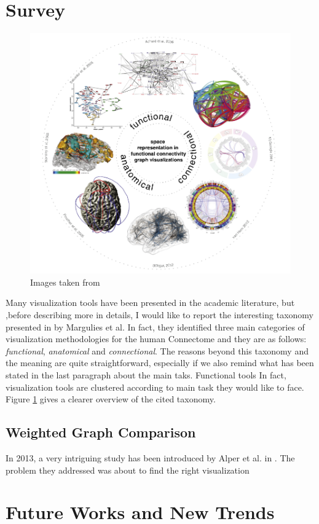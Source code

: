 \documentclass{article}
\begin{document}
\begin{multicols}{2}
\section{Survey}
\begin{figure}[ht]
\centering
\includegraphics[width = 1.8\columnwidth]{taxonomy}
\caption{Images taken from \cite{visualizingHumanConnectome}}
\label{fig:taxonomy}
\end{figure}

Many visualization tools have been presented in the academic literature, but ,before describing more in details, I would like to report the interesting taxonomy presented in \cite{visualizingHumanConnectome} by Margulies et al. In fact, they identified three main categories of visualization methodologies for the human Connectome and they are as follows: \textit{functional}, \textit{anatomical} and \textit{connectional}. The reasons beyond this taxonomy and the meaning are quite straightforward, especially if we also remind what has been stated in the last paragraph about the main taks. Functional tools In fact, visualization tools are clustered according to main task they would like to face. Figure \ref{fig:taxonomy} gives a clearer overview of the cited taxonomy. 

\subsection{Weighted Graph Comparison}
In 2013, a very intriguing study has been introduced by Alper et al. in \cite{weightedGraphComparison}. The problem they addressed was about to find the right visualization 




\section{Future Works and New Trends}


{}
  





\end{multicols}
\end{document}
